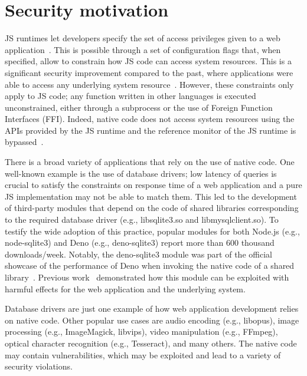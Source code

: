 \section{Security motivation}
\label{sect:sci-ffi}

JS runtimes let developers specify the set of access privileges given
to a web application~\cite{deno-permissions, node-permissions}.  This
is possible through a set of configuration flags that, when specified,
allow to constrain how JS code can access system resources.  This is a
significant security improvement compared to the past, where
applications were able to access any underlying system
resource~\cite{staicu2018synode, zimmermann-risks}.  However,
these constraints only apply to JS code; any function written in other
languages is executed unconstrained, either through a subprocess or
the use of Foreign Function Interfaces (FFI).  Indeed, native code
does not access system resources using the APIs provided by the JS
runtime and the reference monitor of the JS runtime is
bypassed~\cite{deno-permissions}.

There is a broad variety of applications that rely on the use of
native code.  One well-known example is the use of database drivers;
low latency of queries is crucial to satisfy the constraints on
response time of a web application and a pure JS implementation may
not be able to match them. This led to the development of third-party
modules that depend on the code of shared libraries corresponding to
the required database driver (e.g., libsqlite3.so and
libmysqlclient.so).  To testify the wide adoption of this practice,
popular modules for both Node.js (e.g.,
node-sqlite3) and Deno (e.g.,
deno-sqlite3) report more than 600 thousand
\mbox{downloads/week}. Notably, the deno-sqlite3 module was part of
the official showcase of the performance of Deno when invoking the
native code of a shared library~\cite{deno-ffi-improvements}. Previous
work~\cite{staicu2021bilingual} demonstrated how this module can be
exploited with harmful effects for the web application and the
underlying system.

Database drivers are just one example of how web application
development relies on native code.  Other popular use cases are audio
encoding (e.g., libopus), image processing (e.g., ImageMagick,
libvips), video manipulation (e.g., FFmpeg), optical character
recognition (e.g., Tesseract), and many others.  The native code may
contain vulnerabilities, which may be exploited and lead to a variety
of security violations.

